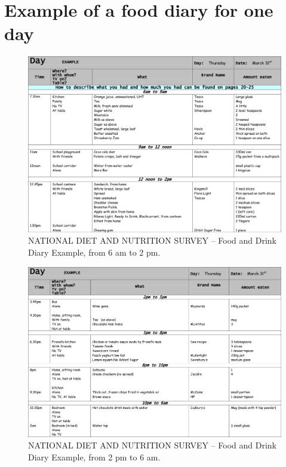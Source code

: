 
\chapter{Example of a food diary for one day} %


\label{AppendixE} %

\begin{figure}[H]
\centering
\includegraphics{Figures/Diary1.png}
\decoRule
\caption[One day food diary example 6 am to 2 pm]{NATIONAL DIET AND NUTRITION SURVEY -- Food and Drink Diary Example, from 6 am to 2 pm.}
\label{fig:diary1}
\end{figure}

\begin{figure}[H]
\centering
\includegraphics{Figures/Diary2.png}
\decoRule
\caption[One day food diary example 2 pm to 6 am]{NATIONAL DIET AND NUTRITION SURVEY -- Food and Drink Diary Example, from 2 pm to 6 am.}
\label{fig:diary2}
\end{figure}

